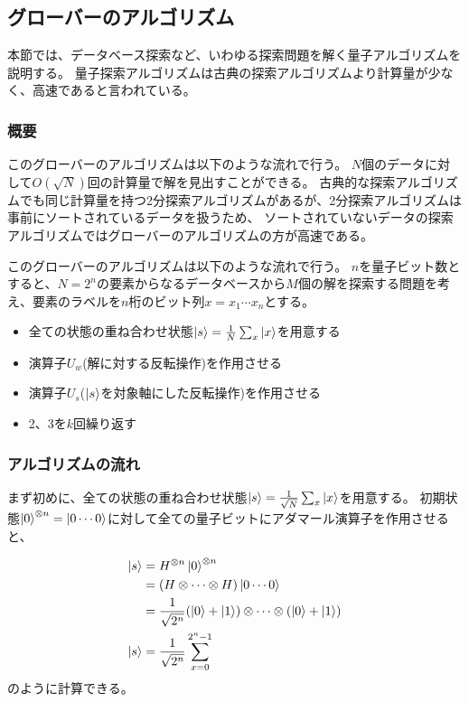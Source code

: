 \begin{comment}
    ここではグローバーのアルゴリズムについて記述する
\end{comment}

\subsection{グローバーのアルゴリズム}
本節では、データベース探索など、いわゆる探索問題を解く量子アルゴリズムを説明する。
量子探索アルゴリズムは古典の探索アルゴリズムより計算量が少なく、高速であると言われている。

\subsubsection{概要}
このグローバーのアルゴリズムは以下のような流れで行う。
$N$個のデータに対して$O(\sqrt{N})$回の計算量で解を見出すことができる。
古典的な探索アルゴリズムでも同じ計算量を持つ2分探索アルゴリズムがあるが、2分探索アルゴリズムは事前にソートされているデータを扱うため、
ソートされていないデータの探索アルゴリズムではグローバーのアルゴリズムの方が高速である。

このグローバーのアルゴリズムは以下のような流れで行う。
$n$を量子ビット数とすると、$N = 2^n$の要素からなるデータベースから$M$個の解を探索する問題を考え、要素のラベルを$n$桁のビット列$x = x_1 \cdots x_n$とする。

\begin{itemize}
    \item 全ての状態の重ね合わせ状態$\ket{s} = \frac{1}{N} \sum_{x} \ket{x}$を用意する
    \item 演算子$U_w$(解に対する反転操作)を作用させる
    \item 演算子$U_s$($\ket{s}$を対象軸にした反転操作)を作用させる
    \item 2、3を$k$回繰り返す
\end{itemize}

\subsubsection{アルゴリズムの流れ}
まず初めに、全ての状態の重ね合わせ状態$\ket{s} = \frac{1}{\sqrt{N}} \sum_{x} \ket{x}$を用意する。
初期状態$\ket{0}^{\otimes n} = \ket{0 \cdots 0}$に対して全ての量子ビットにアダマール演算子を作用させると、

\begin{equation}
    \begin{split}
      \ket{s} &= H^{\otimes n}\ket{0}^{\otimes n} \\
      &= (H \otimes \cdots \otimes H)\ket{0 \cdots 0} \\
      &= \frac{1}{\sqrt{2^n}}(\ket{0} + \ket{1}) \otimes \cdots \otimes (\ket{0} + \ket{1}) \\
      \ket{s} &= \frac{1}{\sqrt{2^n}} \sum_{x = 0}^{2^n - 1}
    \end{split}
\end{equation}
のように計算できる。

